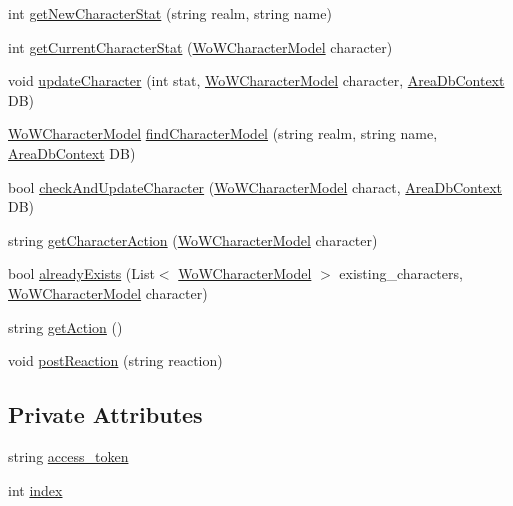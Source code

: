 \begin{DoxyCompactItemize}
\item 
int \mbox{\hyperlink{classArea_1_1Models_1_1WoWModuleModel_ab2b61af7b2f25f528aa4f13b1f6a003f}{get\+New\+Character\+Stat}} (string realm, string name)
\item 
int \mbox{\hyperlink{classArea_1_1Models_1_1WoWModuleModel_a56e8c118476cac7b8215f3c9854b0940}{get\+Current\+Character\+Stat}} (\mbox{\hyperlink{classArea_1_1Models_1_1WoWCharacterModel}{Wo\+W\+Character\+Model}} character)
\item 
void \mbox{\hyperlink{classArea_1_1Models_1_1WoWModuleModel_a300d26f5cbb39e4176a39f1a7b1e9991}{update\+Character}} (int stat, \mbox{\hyperlink{classArea_1_1Models_1_1WoWCharacterModel}{Wo\+W\+Character\+Model}} character, \mbox{\hyperlink{classArea_1_1DAT_1_1AreaDbContext}{Area\+Db\+Context}} DB)
\item 
\mbox{\hyperlink{classArea_1_1Models_1_1WoWCharacterModel}{Wo\+W\+Character\+Model}} \mbox{\hyperlink{classArea_1_1Models_1_1WoWModuleModel_a83ef0a015538f89f334116748c95aec6}{find\+Character\+Model}} (string realm, string name, \mbox{\hyperlink{classArea_1_1DAT_1_1AreaDbContext}{Area\+Db\+Context}} DB)
\item 
bool \mbox{\hyperlink{classArea_1_1Models_1_1WoWModuleModel_afe80d3a4a6c090c38add2b91aa55b2c0}{check\+And\+Update\+Character}} (\mbox{\hyperlink{classArea_1_1Models_1_1WoWCharacterModel}{Wo\+W\+Character\+Model}} charact, \mbox{\hyperlink{classArea_1_1DAT_1_1AreaDbContext}{Area\+Db\+Context}} DB)
\item 
string \mbox{\hyperlink{classArea_1_1Models_1_1WoWModuleModel_a063f2a1a7837561b588f016d828061ee}{get\+Character\+Action}} (\mbox{\hyperlink{classArea_1_1Models_1_1WoWCharacterModel}{Wo\+W\+Character\+Model}} character)
\item 
bool \mbox{\hyperlink{classArea_1_1Models_1_1WoWModuleModel_ad72c3aa9fcf7c7327103e6d885b3b11e}{already\+Exists}} (List$<$ \mbox{\hyperlink{classArea_1_1Models_1_1WoWCharacterModel}{Wo\+W\+Character\+Model}} $>$ existing\+\_\+characters, \mbox{\hyperlink{classArea_1_1Models_1_1WoWCharacterModel}{Wo\+W\+Character\+Model}} character)
\item 
string \mbox{\hyperlink{classArea_1_1Models_1_1WoWModuleModel_a3ed39b2aeec20f1d908d9c6e43aad389}{get\+Action}} ()
\item 
void \mbox{\hyperlink{classArea_1_1Models_1_1WoWModuleModel_a04335d82b02dd3cfe3b9ae0cb47125f6}{post\+Reaction}} (string reaction)
\end{DoxyCompactItemize}
\subsection*{Private Attributes}
\begin{DoxyCompactItemize}
\item 
string \mbox{\hyperlink{classArea_1_1Models_1_1WoWModuleModel_a21d75a09cbc7636a9b0984af052e2b4f}{access\+\_\+token}}
\item 
int \mbox{\hyperlink{classArea_1_1Models_1_1WoWModuleModel_aac650af907ed739ace201b3b5d616bb7}{index}}
\end{DoxyCompactItemize}


